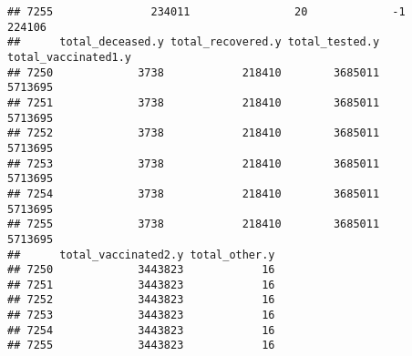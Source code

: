 \documentclass[
]{article}
\begin{document}
\begin{verbatim}
## 7255               234011                20             -1            224106
##      total_deceased.y total_recovered.y total_tested.y total_vaccinated1.y
## 7250             3738            218410        3685011             5713695
## 7251             3738            218410        3685011             5713695
## 7252             3738            218410        3685011             5713695
## 7253             3738            218410        3685011             5713695
## 7254             3738            218410        3685011             5713695
## 7255             3738            218410        3685011             5713695
##      total_vaccinated2.y total_other.y
## 7250             3443823            16
## 7251             3443823            16
## 7252             3443823            16
## 7253             3443823            16
## 7254             3443823            16
## 7255             3443823            16
\end{verbatim}
\end{document}
